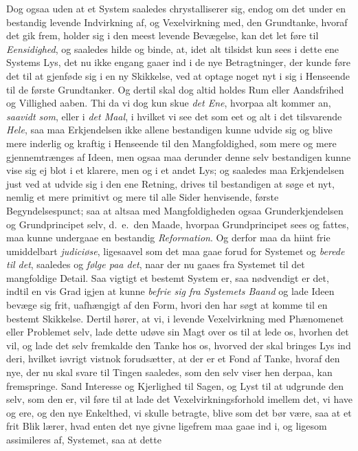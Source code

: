 \documentclass[12pt,a4paper]{book}
\newcommand{\apage}[1]{\marginnote{\footnotesize\textit{[#1]}}}
\begin{document}
Dog ogsaa uden at et System saaledes chrystalliserer sig, endog om det under en
bestandig levende Indvirkning af, og Vexelvirkning med, den Grundtanke, hvoraf det
gik frem, holder sig i den meest levende Bevægelse, kan det let føre til
\emph{Eensidighed}, og saaledes hilde og binde, at, idet alt tilsidst kun sees i
dette ene Systems \apage{139}  Lys, det nu ikke engang gaaer ind i de nye Betragtninger, der
kunde føre det til at gjenføde sig i en ny Skikkelse, ved at optage noget nyt i
sig i Henseende til de første Grundtanker. Og dertil skal dog altid holdes Rum
eller Aandsfrihed og Villighed aaben. Thi da vi dog kun skue \emph{det Ene},
hvorpaa alt kommer an, \emph{saavidt som}, eller i \emph{det Maal}, i hvilket vi see det
som eet og alt i det tilsvarende \emph{Hele}, saa maa Erkjendelsen ikke allene
bestandigen kunne udvide sig og blive mere inderlig og kraftig i Henseende til den
Mangfoldighed, som mere og mere gjennemtrænges af Ideen, men ogsaa maa derunder
denne selv bestandigen kunne vise sig ej blot i et klarere, men og i et andet Lys;
og saaledes maa Erkjendelsen just ved at udvide sig i den ene Retning, drives til
bestandigen at søge et nyt, nemlig et mere primitivt og mere til alle Sider
henvisende, første Begyndelsespunct; saa at altsaa med Mangfoldigheden ogsaa
Grunderkjendelsen og Grundprincipet selv, d.\ e.\ den Maade, hvorpaa
Grundprincipet sees og fattes, maa kunne undergaae en bestandig \emph{Reformation}.
Og derfor maa da hiint frie umiddelbart \emph{judiciøse}, ligesaavel som det maa
gaae forud for Systemet og \emph{berede til det}, saaledes og \emph{følge paa det}, naar
der nu gaaes fra Systemet til det mangfoldige Detail. Saa vigtigt et bestemt
System er, saa nødvendigt er det, indtil en vis Grad igjen at \apage{140} kunne \emph{befrie sig fra
Systemets Baand} og lade Ideen bevæge sig frit, uafhængigt af den Form, hvori den
har søgt at komme til en bestemt Skikkelse. Dertil hører, at vi, i levende
Vexelvirkning med Phænomenet eller Problemet selv, lade dette udøve sin Magt over
os til at lede os, hvorhen det vil, og lade det selv fremkalde den Tanke hos os,
hvorved der skal bringes Lys ind deri, hvilket iøvrigt vistnok forudsætter, at der
er et Fond af Tanke, hvoraf den nye, der nu skal svare til Tingen saaledes, som den
selv viser hen derpaa, kan fremspringe. Sand Interesse og Kjerlighed til Sagen, og
Lyst til at udgrunde den selv, som den er, vil føre til at lade det
Vexelvirkningsforhold imellem det, vi have og ere, og den nye Enkelthed, vi skulle
betragte, blive som det bør være, saa at et frit Blik lærer, hvad enten det nye
givne ligefrem maa gaae ind i, og ligesom assimileres af, Systemet, saa at dette
\end{document}
